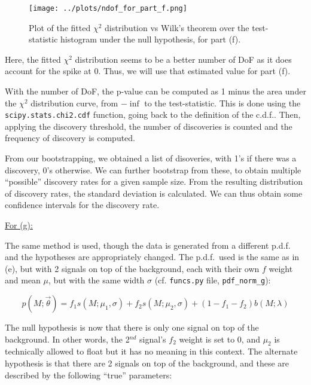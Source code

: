\documentclass[12pt]{report} %
\begin{document}
\begin{figure}[htb]
    \centering
    \texttt{[image: ../plots/ndof\_for\_part\_f.png]}
    \captionsetup{margin=1.3cm}
    \caption[width=0.2\pdfpagewidth]{Plot of the fitted $\chi^{2}$ distribution vs Wilk's theorem over the test-statistic histogram under the null hypothesis, for part (f).}
\end{figure}

\newpage
Here, the fitted $\chi^{2}$ distribution seems to be a better number of DoF as it does account for the spike at 0. Thus, we will use that estimated value for part (f).  

With the number of DoF, the p-value can be computed as 1 minus the area under the $\chi^{2}$ distribution curve, from $-\inf$ to the test-statistic. This is done using the \texttt{scipy.stats.chi2.cdf} function, going back to the definition of the c.d.f.\cite[pp. 20-23]{Wass}\cite{scipy-stats}. Then, applying the discovery threshold, the number of discoveries is counted and the frequency of discovery is computed.  

From our bootstrapping, we obtained a list of disoveries, with 1's if there was a discovery, 0's otherwise. We can further bootstrap from these, to obtain multiple ``possible'' discovery rates for a given sample size. From the resulting distribution of discovery rates, the standard deviation is calculated. We can thus obtain some confidence intervals for the discovery rate.

\vspace*{1\baselineskip}
\underline{For (g):} 

\vspace*{1\baselineskip}
The same method is used, though the data is generated from a different p.d.f. and the hypotheses are appropriately changed. The p.d.f.\ used is the same as in (e), but with 2 signals on top of the background, each with their own $f$ weight and mean $\mu$, but with the same width $\sigma$ (cf. \texttt{funcs.py} file, \texttt{pdf\_norm\_g}):  

\begin{equation}
    p(M;\vec{\theta}) = f_{1}s(M;\mu_{1},\sigma) + f_{2}s(M;\mu_{2},\sigma) + (1 - f_{1} - f_{2})b(M;\lambda)
\end{equation}


The null hypothesis is now that there is only one signal on top of the background. In other words, the 2$^{nd}$ signal's $f_{2}$ weight is set to 0, and $\mu_{2}$ is technically allowed to float but it has no meaning in this context. The alternate hypothesis is that there are 2 signals on top of the background, and these are described by the following ``true'' parameters:
\end{document}
